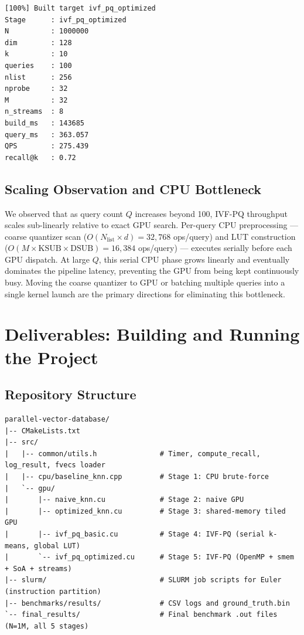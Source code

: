 \documentclass[12pt]{article}
\begin{document}
\begin{lstlisting}[style=terminal, caption={Stage 5 --- IVF-PQ Optimized (OpenMP + smem LUT + SoA + CUDA streams) (output-352713.out)}]
[100%] Built target ivf_pq_optimized
Stage      : ivf_pq_optimized
N          : 1000000
dim        : 128
k          : 10
queries    : 100
nlist      : 256
nprobe     : 32
M          : 32
n_streams  : 8
build_ms   : 143685
query_ms   : 363.057
QPS        : 275.439
recall@k   : 0.72
\end{lstlisting}

\subsection{Scaling Observation and CPU Bottleneck}

We observed that as query count $Q$ increases beyond 100, IVF-PQ throughput
scales sub-linearly relative to exact GPU search.
Per-query CPU preprocessing --- coarse quantizer scan
($O(N_\text{list} \times d) = 32{,}768$ ops/query)
and LUT construction
($O(M \times \text{KSUB} \times \text{DSUB}) = 16{,}384$ ops/query)
--- executes serially before each GPU dispatch.
At large $Q$, this serial CPU phase grows linearly and eventually dominates
the pipeline latency, preventing the GPU from being kept continuously busy.
Moving the coarse quantizer to GPU or batching multiple queries into a single
kernel launch are the primary directions for eliminating this bottleneck.

\section{Deliverables: Building and Running the Project}

\subsection*{Repository Structure}
\begin{lstlisting}[style=terminal]
parallel-vector-database/
|-- CMakeLists.txt
|-- src/
|   |-- common/utils.h               # Timer, compute_recall, log_result, fvecs loader
|   |-- cpu/baseline_knn.cpp         # Stage 1: CPU brute-force
|   `-- gpu/
|       |-- naive_knn.cu             # Stage 2: naive GPU
|       |-- optimized_knn.cu         # Stage 3: shared-memory tiled GPU
|       |-- ivf_pq_basic.cu          # Stage 4: IVF-PQ (serial k-means, global LUT)
|       `-- ivf_pq_optimized.cu      # Stage 5: IVF-PQ (OpenMP + smem + SoA + streams)
|-- slurm/                           # SLURM job scripts for Euler (instruction partition)
|-- benchmarks/results/              # CSV logs and ground_truth.bin
`-- final_results/                   # Final benchmark .out files (N=1M, all 5 stages)
\end{lstlisting}
\end{document}
